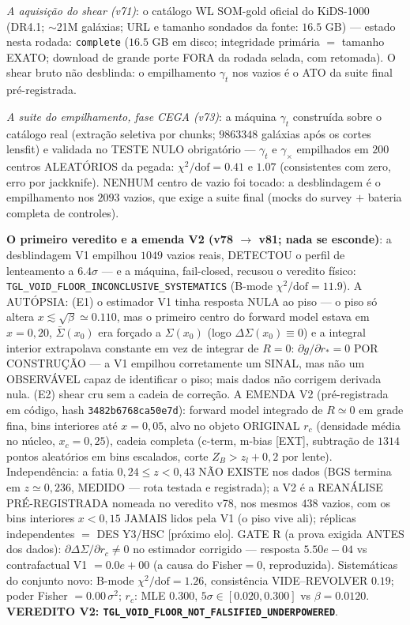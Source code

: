 \documentclass[11pt]{article}
\theoremstyle{definition}\newtheorem{deriv}{Derivação}
\begin{document}
\emph{A aquisição do shear (v71)}: o catálogo WL SOM-gold oficial do KiDS-1000 (DR4.1; $\sim$21M galáxias; URL e tamanho sondados da fonte: $16.5$ GB) --- estado nesta rodada: \texttt{complete} ($16.5$ GB em disco; integridade primária $=$ tamanho EXATO; download de grande porte FORA da rodada selada, com retomada). O shear bruto não desblinda: o empilhamento $\gamma_t$ nos vazios é o ATO da suite final pré-registrada.

\emph{A suite do empilhamento, fase CEGA (v73)}: a máquina $\gamma_t$ construída sobre o catálogo real (extração seletiva por chunks; $9863348$ galáxias após os cortes lensfit) e validada no TESTE NULO obrigatório --- $\gamma_t$ e $\gamma_\times$ empilhados em $200$ centros ALEATÓRIOS da pegada: $\chi^2/\mathrm{dof}=0.41$ e $1.07$ (consistentes com zero, erro por jackknife). NENHUM centro de vazio foi tocado: a desblindagem é o empilhamento nos $2093$ vazios, que exige a suite final (mocks do survey $+$ bateria completa de controles).

\textbf{O primeiro veredito e a emenda V2 (v78 $\to$ v81; nada se esconde)}: a desblindagem V1 empilhou $1049$ vazios reais, DETECTOU o perfil de lenteamento a $6.4\sigma$ --- e a máquina, fail-closed, recusou o veredito físico: \texttt{TGL\_VOID\_FLOOR\_INCONCLUSIVE\_SYSTEMATICS} (B-mode $\chi^2/\mathrm{dof}=11.9$). A AUTÓPSIA: (E1) o estimador V1 tinha resposta NULA ao piso --- o piso só altera $x\lesssim\sqrt{\beta}\simeq0.110$, mas o primeiro centro do forward model estava em $x=0{,}20$, $\bar\Sigma(x_0)$ era forçado a $\Sigma(x_0)$ (logo $\Delta\Sigma(x_0)\equiv0$) e a integral interior extrapolava constante em vez de integrar de $R=0$: $\partial g/\partial r_*=0$ POR CONSTRUÇÃO --- a V1 empilhou corretamente um SINAL, mas não um OBSERVÁVEL capaz de identificar o piso; mais dados não corrigem derivada nula. (E2) shear cru sem a cadeia de correção. A EMENDA V2 (pré-registrada em código, hash \texttt{3482b6768ca50e7d}): forward model integrado de $R\simeq0$ em grade fina, bins interiores até $x=0{,}05$, alvo no objeto ORIGINAL $r_c$ (densidade média no núcleo, $x_c=0{,}25$), cadeia completa (c-term, m-bias [EXT], subtração de $1314$ pontos aleatórios em bins escalados, corte $Z_B>z_l+0{,}2$ por lente). Independência: a fatia $0{,}24\le z<0{,}43$ NÃO EXISTE nos dados (BGS termina em $z\simeq0{,}236$, MEDIDO --- rota testada e registrada); a V2 é a REANÁLISE PRÉ-REGISTRADA nomeada no veredito v78, nos mesmos $438$ vazios, com os bins interiores $x<0{,}15$ JAMAIS lidos pela V1 (o piso vive ali); réplicas independentes $=$ DES Y3/HSC [próximo elo]. GATE R (a prova exigida ANTES dos dados): $\partial\Delta\Sigma/\partial r_c\neq0$ no estimador corrigido --- resposta $5.50e-04$ vs contrafactual V1 $= 0.0e+00$ (a causa do Fisher$=0$, reproduzida). Sistemáticas do conjunto novo: B-mode $\chi^2/\mathrm{dof}=1.26$, consistência VIDE--REVOLVER $0.19$; poder Fisher $=0.00\,\sigma^2$; $r_c$: MLE $0.300$, $5\sigma\in[0.020,0.300]$ vs $\beta=0.0120$. \textbf{VEREDITO V2: \texttt{TGL\_VOID\_FLOOR\_NOT\_FALSIFIED\_UNDERPOWERED}}.
\end{document}
